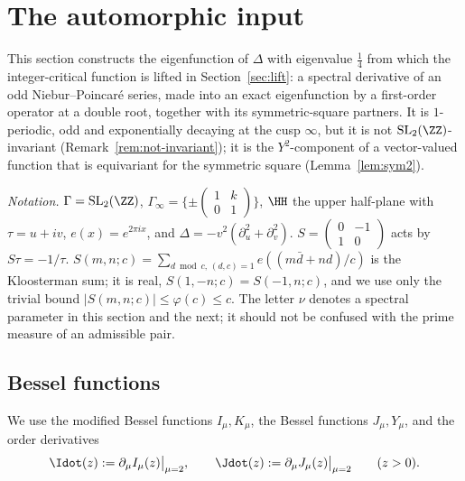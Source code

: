 \section{The automorphic input}\label{sec:automorphic}

This section constructs the eigenfunction of $\Delta$ with eigenvalue $\frac14$ from which the integer-critical function is lifted in
Section~\ref{sec:lift}: a spectral derivative of an odd Niebur--Poincar\'e series, made into an exact eigenfunction by a first-order
operator at a double root, together with its symmetric-square partners. It is $1$-periodic, odd and exponentially decaying at the cusp
$\infty$, but it is not $\mathrm{SL}_2(\ZZ)$-invariant (Remark~\ref{rem:not-invariant}); it is the $Y^2$-component of a vector-valued
function that is equivariant for the symmetric square (Lemma~\ref{lem:sym2}).

\emph{Notation.} $\Gamma=\mathrm{SL}_2(\ZZ)$, $\Gamma_\infty=\{\pm\left(\begin{smallmatrix}1&k\\0&1\end{smallmatrix}\right)\}$, $\HH$ the upper
half-plane with $\tau=u+iv$, $e(x)=e^{2\pi ix}$, and $\Delta=-v^2(\partial_u^2+\partial_v^2)$. $S=\left(\begin{smallmatrix}0&-1\\1&0\end{smallmatrix}\right)$
acts by $S\tau=-1/\tau$. $S(m,n;c)=\sum_{d\bmod c,\,(d,c)=1}e((m\bar d+nd)/c)$ is the Kloosterman sum; it is real, $S(1,-n;c)=S(-1,n;c)$, and
we use only the trivial bound $|S(m,n;c)|\le\varphi(c)\le c$. The letter $\nu$ denotes a spectral parameter in this section and the next;
it should not be confused with the prime measure of an admissible pair.

\subsection{Bessel functions}

We use the modified Bessel functions $I_\mu,K_\mu$, the Bessel functions $J_\mu,Y_\mu$, and the order derivatives
\[
\Idot(z):=\partial_\mu I_\mu(z)\big|_{\mu=2},\qquad \Jdot(z):=\partial_\mu J_\mu(z)\big|_{\mu=2}\qquad(z>0).
\]

